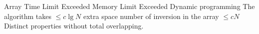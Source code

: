 %
%


 Array 
 Time Limit Exceeded
 Memory Limit Exceeded
 Dynamic programming 
 The algorithm takes $\leq c \lg N$ extra space
 number of inversion in the array $\leq cN$
 Distinct properties without total overlapping. 
